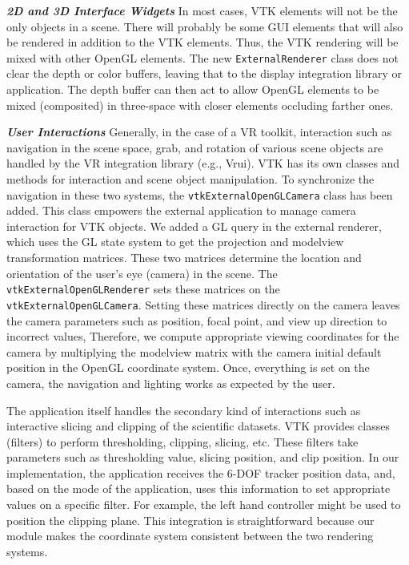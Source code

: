 \textbf{\textit{2D and 3D Interface Widgets}} In most cases, VTK elements will not be the only objects in a scene.
There will probably be some GUI elements that will also be rendered in addition to the VTK elements.
Thus, the VTK rendering will be mixed with other OpenGL elements.
The new \texttt{ExternalRenderer} class does not clear the depth or color buffers, leaving that to the display integration library or application.
The depth buffer can then act to allow OpenGL elements to be mixed (composited) in three-space with closer elements occluding farther ones.

\textbf{\textit{User Interactions}} Generally, in the case of a VR toolkit, interaction such as navigation in the scene space, grab, and rotation of various scene objects are handled by the VR integration library (e.g., Vrui).
VTK has its own classes and methods for interaction and scene object manipulation.
To synchronize the navigation in these two systems, the \texttt{vtkExternalOpenGLCamera} class has been added.
This class empowers the external application to manage camera interaction for VTK objects.
We added a GL query in the external renderer, which uses the GL state system to get the projection and modelview transformation matrices.
These two matrices determine the location and orientation of the user's eye
(camera) in the scene.
The \texttt{vtkExternalOpenGLRenderer} sets these matrices on the \texttt{vtkExternalOpenGLCamera}.
Setting these matrices directly on the camera leaves the camera parameters such as position, focal point, and view up direction to incorrect values, Therefore, we compute appropriate viewing coordinates for the camera by multiplying the modelview matrix with the camera initial default position in the OpenGL coordinate system. 
Once, everything is set on the camera, the navigation and lighting works as expected by the user.

The application itself handles the secondary kind of interactions such as interactive slicing and clipping of the scientific datasets.
VTK provides classes (filters) to perform thresholding, clipping, slicing, etc.
These filters take parameters such as thresholding value, slicing position, and clip position. 
In our implementation, the application receives the 6-DOF tracker position data, and, based on the mode of the application, uses this information to set appropriate values on a specific filter.
For example, the left hand controller might be used to position the clipping plane.
This integration is straightforward because our module makes the coordinate system consistent between the two rendering systems.


